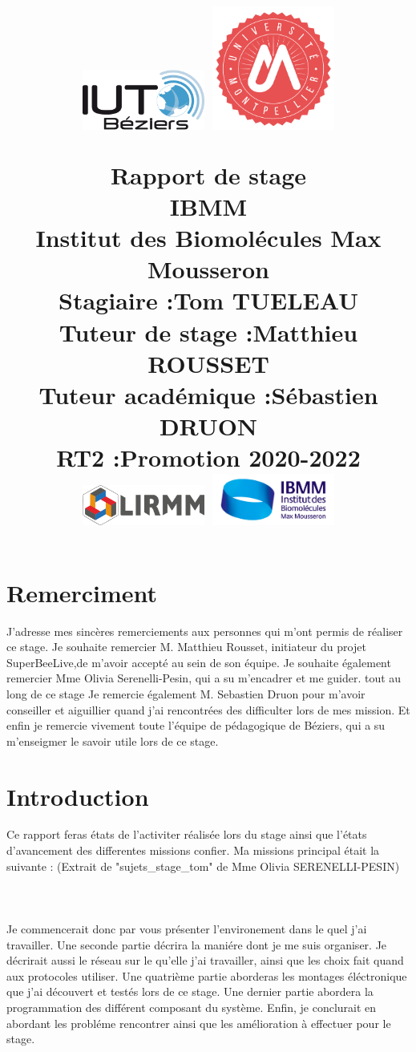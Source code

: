 \documentclass[11pt,french,a4paper]{article}
\title{
	\bigskip
 \centering
         \includegraphics[width=4cm]{../../../logo/IUTlogo.png}  \hspace{7cm}
         \includegraphics[width=4cm]{../../../logo/UMlogo.png}  \hspace{7cm}

	\LARGE{Rapport de stage}
	\\
	\LARGE{IBMM}
	\\
	\large{\textbf{Institut des Biomolécules Max Mousseron}}
	\\
	\large{Stagiaire :\textbf{Tom TUELEAU}}
	\\
	\large{Tuteur de stage :\textbf{Matthieu ROUSSET}}
	\\
	\large{Tuteur académique :\textbf{Sébastien DRUON}}
	\\
	\large{RT2 :Promotion 2020-2022}
	\\
         \includegraphics[width=4cm]{../../../logo/LIRMMlogo.png}  \hspace{7cm}
         \includegraphics[width=4cm]{../../../logo/IBMMlogo.jpg}  \hspace{7cm}
}
\author{
	\date{}
}
\begin{document}
\maketitle

\newpage
\section*{Remerciment}
J’adresse mes sincères remerciements aux personnes qui m’ont permis de réaliser ce stage.
Je souhaite remercier M. Matthieu Rousset, initiateur du projet SuperBeeLive,de m’avoir accepté au sein de son équipe.
Je souhaite également remercier Mme Olivia Serenelli-Pesin, qui a su m’encadrer et me guider. tout au long de ce stage
Je remercie également M. Sebastien Druon pour m’avoir conseiller et aiguillier quand j'ai rencontrées des difficulter lors de mes mission.
Et enfin je remercie vivement toute l’équipe de pédagogique de Béziers, qui a su m'enseigmer le savoir utile lors de ce stage.

\newpage
\tableofcontents

\newpage
\section{Introduction}
Ce rapport feras états de l'activiter réalisée lors du stage ainsi que l'états d'avancement des differentes missions confier. Ma missions principal était la suivante : (Extrait de "sujets\_stage\_tom" de Mme Olivia SERENELLI-PESIN) 
\\
\\
\\
\\
Je commencerait donc par vous présenter l'environement dans le quel j'ai travailler. Une seconde partie décrira la maniére dont je me suis organiser. Je décrirait aussi le réseau sur le qu'elle j'ai travailler, ainsi que les choix fait quand aux protocoles utiliser. Une quatrième partie aborderas les montages éléctronique que j'ai découvert et testés lors de ce stage. Une dernier partie abordera la programmation des différent composant du système. Enfin, je conclurait en abordant les probléme rencontrer ainsi que les amélioration à effectuer pour le stage.
\end{document}

